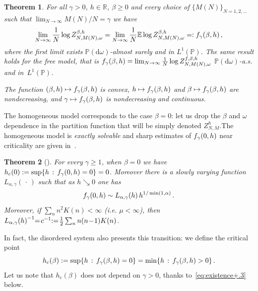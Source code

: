 \documentclass[11pt]{article}
\newtheorem{theo}{Theorem}[section]
\theoremstyle{definition}
\numberwithin{equation}{section}
\numberwithin{figure}{section}
\numberwithin{table}{section}
\newcommand{\ga}{\alpha}
\newcommand{\gb}{\beta}
\newcommand{\go}{\omega}
\newcommand{\dd}{\mathrm{d}}
\newcommand{\tf}{\textsc{f}} %
\newcommand{\bbE}{\ensuremath{\mathbb{E}}}
\newcommand{\bbP}{\ensuremath{\mathbb{P}}}
\newcommand{\bbR}{\ensuremath{\mathbb{R}}}
\newcommand*{\Mk}{\mkern -2mu}
\begin{document}
\begin{theo}\label{th:fq}
For all $\gamma>0$, $h \in \bbR$, $\beta \ge 0$ and every choice of $\{M(N)\}_{N=1,2, \ldots}$ such that $\lim_{N\to\infty} M(N)/N=\gamma$ we have
\begin{equation}\label{eq:saf}
\lim_{N\to\infty} \frac{1}{N} \log Z^{\gb,h}_{N,M(N),\omega} = \lim_{N\to\infty} \frac{1}{N} \bbE \log Z^{\gb,h}_{N,M(N),\omega} =: \tf_{\gamma}(\beta,h)\,,
\end{equation}
where the first limit exists $\bbP(\dd \go)$-almost surely and in $L^1(\bbP)$. The same result holds for the free model, that is $\tf_{\gamma}(\beta,h) = \lim_{N\to\infty} \frac{1}{N} \log Z^{f,\gb,h}_{N,M(N),\omega}$ $\bbP(\dd \go)$-a.s. and in~$L^1(\bbP)$.

The function $(\gb,h) \mapsto \tf_{\gamma}(\gb,h)$ is convex, $h\mapsto \tf_{\gamma}(\gb,h)$ and $\gb\mapsto \tf_{\gamma}(\gb,h)$ are nondecreasing, and $\gamma \mapsto \tf_{\gamma}(\gb,h)$ is nondecreasing and continuous.
\end{theo}

The homogeneous model corresponds to the case $\beta = 0$: let us drop the $\gb$ and $\go$ dependence in the partition function that will be simply denoted $Z_{N, M}^h$.\linebreak The homogeneous model is \emph{exactly solvable} and sharp estimates of $\tf_\gamma (0,h)$ near criticality are given in~\cite{cf:GK}.

\begin{theo}[\cite{cf:GK}]\label{th:beta0}
For every $\gamma \ge 1$, when $\beta=0$ we have $h_c(0) := \sup\{ h\,:\,\tf_{\gamma}(0,h)=0\}= 0$. Moreover there is a slowly varying function $L_{\ga, \gamma}({\,\cdot\,})$ such that as $h \searrow 0$ one has
\begin{equation}
\tf_\gamma (0,h) \sim L_{\ga,\gamma} (h)\,h^{1/ \min (1, \ga)}\,.
\end{equation}
Moreover, if $\sum_n n^2 K(n) \!<\! \infty$ (i.e. $\mu\!<\!\infty$), then ${L_{\ga,\gamma}(h)}^{-1} \Mk\!=\! c^{-1} \!\Mk:=\! \frac{1}{2} \sum_{n } n(n\!-\!1) K(n)$.
\end{theo}

In fact, the disordered system also presents this transition: we define the critical point
\begin{equation}
h_c(\beta) := \sup \lbrace h\,:\,\tf_\gamma (\beta,h) = 0 \rbrace = \min \lbrace h\,:\,\tf_\gamma (\beta,h) >0 \rbrace\,.
\end{equation}
Let us note that $h_c(\gb)$ does not depend on $\gamma >0$, thanks to~\eqref{eq:existence+.3} below.
\end{document}
